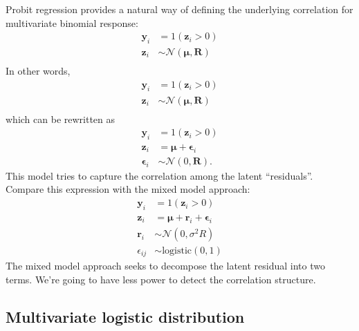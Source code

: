 \documentclass{article}\usepackage[]{graphicx}\usepackage[]{color}
\begin{document}
Probit regression provides a natural way of defining the underlying correlation for multivariate binomial response:
\begin{equation}
\begin{aligned}
\mathbf y_i &= 1(\mathbf z_i > 0)\\
\mathbf z_i &\sim \mathcal{N}(\pmb \mu, \mathbf R)\\
\end{aligned}
\end{equation}
In other words,
\begin{equation}
\begin{aligned}
\mathbf y_i &= 1(\mathbf z_i > 0)\\
\mathbf z_i &\sim \mathcal{N}(\pmb \mu, \mathbf R)\\
\end{aligned}
\end{equation}
which can be rewritten as
\begin{equation}
\begin{aligned}
\mathbf y_i &= 1(\mathbf z_i > 0)\\
\mathbf z_i &= \pmb \mu + \pmb \epsilon_i \\
\pmb \epsilon_i &\sim \mathcal N(0, \mathbf R).
\end{aligned}
\end{equation}
This model tries to capture the correlation among the latent ``residuals''.
Compare this expression with the mixed model approach:
\begin{equation}
\begin{aligned}
\mathbf y_i &= 1(\mathbf z_i > 0)\\
\mathbf z_i &= \pmb \mu + \mathbf r_i + \pmb \epsilon_i\\
\mathbf r_i &\sim \mathcal{N}(0, \sigma^2 R)\\
\epsilon_{ij} &\sim \mathrm{logistic}(0, 1)
\end{aligned}
\end{equation}
The mixed model approach seeks to decompose the latent residual into two terms. We're going to have less power to detect the correlation structure.


\subsection{Multivariate logistic distribution}
\end{document}
